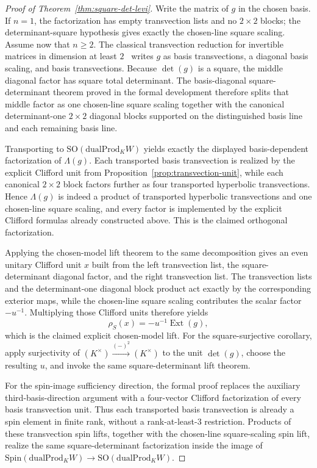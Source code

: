 \documentclass{birkjour}
\theoremstyle{plain}
\theoremstyle{definition}
\theoremstyle{remark}
\newcommand{\Spin}{\mathrm{Spin}}
\newcommand{\SO}{\mathrm{SO}}
\newcommand{\dualProd}{\mathrm{dualProd}}
\newcommand{\ExtMap}{\operatorname{Ext}}
\begin{document}
\begin{proof}[Proof of Theorem~{}\ref{thm:square-det-levi}]
Write the matrix of $g$ in the chosen basis. If \(n=1\), the factorization has
empty transvection lists and no \(2\times2\) blocks; the determinant-square
hypothesis gives exactly the chosen-line square scaling. Assume now that
\(n\ge2\). The classical transvection reduction for invertible matrices in
dimension at least $2$~{}\cite[Ch.~IV]{Artin1957GeometricAlgebra} writes $g$ as
basis transvections, a diagonal basis scaling, and basis transvections. Because
$\det(g)$ is a square, the middle diagonal factor has square total determinant.
The basis-diagonal square-determinant theorem proved in the formal development
therefore splits that middle factor as one chosen-line square scaling together
with the canonical determinant-one $2\times2$ diagonal blocks supported on the
distinguished basis line and each remaining basis line.

Transporting to $\SO(\dualProd_K W)$ yields exactly the displayed basis-dependent
factorization of $\Lambda(g)$. Each transported basis transvection is realized
by the explicit Clifford unit from Proposition~{}\ref{prop:transvection-unit},
while each canonical $2\times2$ block factors further as four transported
hyperbolic transvections. Hence $\Lambda(g)$ is indeed a product of transported
hyperbolic transvections and one chosen-line square scaling, and every factor is
implemented by the explicit Clifford formulas already constructed above. This is
the claimed orthogonal factorization.

Applying the chosen-model lift theorem to the same decomposition gives an even
unitary Clifford unit $x$ built from the left transvection list, the
square-determinant diagonal factor, and the right transvection list. The
transvection lists and the determinant-one diagonal block product act exactly by
the corresponding exterior maps, while the chosen-line square scaling
contributes the scalar factor $-u^{-1}$. Multiplying those Clifford units
therefore yields
\[
  \rho_S(x)=-u^{-1}\ExtMap(g),
\]
which is the claimed explicit chosen-model lift.
For the square-surjective corollary, apply surjectivity of
\((K^\times)\xrightarrow{(-)^2}(K^\times)\) to the unit \(\det(g)\), choose
the resulting $u$, and invoke the same square-determinant lift theorem.

For the spin-image sufficiency direction, the formal proof replaces the auxiliary
third-basis-direction argument with a four-vector Clifford factorization of every
basis transvection unit. Thus each transported basis transvection is already a
spin element in finite rank, without a rank-at-least-$3$ restriction. Products
of these transvection spin lifts, together with the chosen-line square-scaling
spin lift, realize the same square-determinant factorization inside the image of
\(\Spin(\dualProd_K W)\to\SO(\dualProd_K W)\).


\end{proof}
\end{document}

